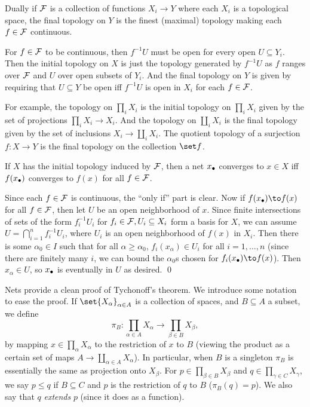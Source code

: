     Dually if ${{\cal F}}$ is a collection of functions $X_i\to Y$ where each $X_i$ is a topological space, the {\emphcolor final} topology on $Y$ is the finest (maximal)
    topology making each $f\in{{\cal F}}$ continuous.

\edefn

For $f\in{{\cal F}}$ to be continuous, then $f^{-1}U$ must be open for every open $U\subseteq Y_i$.
Then the initial topology on $X$ is just the topology generated by $f^{-1}U$ as $f$ ranges over ${{\cal F}}$ and $U$ over open subsets of $Y_i$.
And the final topology on $Y$ is given by requiring that $U\subseteq Y$ be open iff $f^{-1}U$ is open in $X_i$ for each $f\in{{\cal F}}$.

For example, the topology on $\prod_iX_i$ is the initial topology on $\prod_iX_i$ given by the set of projections $\prod_iX_i\to X_i$.
And the topology on $\coprod_iX_i$ is the final topology given by the set of inclusions $X_i\to\coprod_iX_i$.
The quotient topology of a surjection $f\colon X\to Y$ is the final topology on the collection $\set f$.

\bprop

    If $X$ has the initial topology induced by ${{\cal F}}$, then a net $x_\bullet$ converges to $x\in X$ iff $f(x_\bullet)$ converges to $f(x)$ for all $f\in{{\cal F}}$.

\eprop

\bproof

    Since each $f\in{{\cal F}}$ is continuous, the ``only if'' part is clear.
    Now if $f(x_\bul)\to f(x)$ for all $f\in{{\cal F}}$, then let $U$ be an open neighborhood of $x$.
    Since finite intersections of sets of the form $f_i^{-1}U_i$ for $f_i\in{{\cal F}},U_i\subseteq X_i$ form a basis for $X$, we can assume $U=\bigcap_{i=1}^nf_i^{-1}U_i$,
    where $U_i$ is an open neighborhood of $f(x)$ in $X_i$.
    Then there is some $\alpha_0\in I$ such that for all $\alpha\geq\alpha_0$, $f_i(x_\alpha)\in U_i$ for all $i=1,\dots,n$ (since there are finitely many $i$, we can bound
    the $\alpha_0$s chosen for $f_i(x_\bul)\to f(x)$).
    Then $x_\alpha\in U$, so $x_\bullet$ is eventually in $U$ as desired.
    \qed

\eproof

Nets provide a clean proof of Tychonoff's theorem.
We introduce some notation to ease the proof.
If $\set{X_\alpha}_{\alpha\in A}$ is a collection of spaces, and $B\subseteq A$ a subset, we define
$$ \pi_B\colon\prod_{\alpha\in A}X_\alpha \to \prod_{\beta\in B}X_\beta , $$
by mapping $x\in\prod_\alpha X_\alpha$ to the restriction of $x$ to $B$ (viewing the product as a certain set of maps $A\to\coprod_{\alpha\in A}X_\alpha$).
In particular, when $B$ is a singleton $\pi_B$ is essentially the same as projection onto $X_\beta$.
For $p\in\prod_{\beta\in B}X_\beta$ and $q\in\prod_{\gamma\in C}X_\gamma$, we say $p\leq q$ if $B\subseteq C$ and $p$ is the restriction of $q$ to $B$ ($\pi_B(q)=p$).
We also say that $q$ {\it extends\/} $p$ (since it does as a function).

